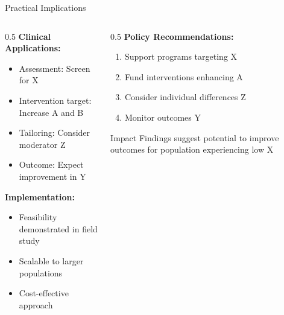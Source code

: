 \documentclass[aspectratio=169,12pt]{beamer}
\begin{document}
\begin{frame}{Practical Implications}
  \begin{columns}[T]

    \begin{column}{0.5\textwidth}
      \textbf{Clinical Applications:}
      \begin{itemize}
        \item Assessment: Screen for X
        \item Intervention target: Increase A and B
        \item Tailoring: Consider moderator Z
        \item Outcome: Expect improvement in Y
      \end{itemize}

      \vspace{0.5cm}

      \textbf{Implementation:}
      \begin{itemize}
        \item Feasibility demonstrated in field study
        \item Scalable to larger populations
        \item Cost-effective approach
      \end{itemize}
    \end{column}

    \begin{column}{0.5\textwidth}
      \textbf{Policy Recommendations:}
      \begin{enumerate}
        \item Support programs targeting X
        \item Fund interventions enhancing A
        \item Consider individual differences Z
        \item Monitor outcomes Y
      \end{enumerate}

      \vspace{0.5cm}

      \begin{alertblock}{Impact}
        Findings suggest potential to improve outcomes for population experiencing low X
      \end{alertblock}
    \end{column}

  \end{columns}
\end{frame}
\end{document}
